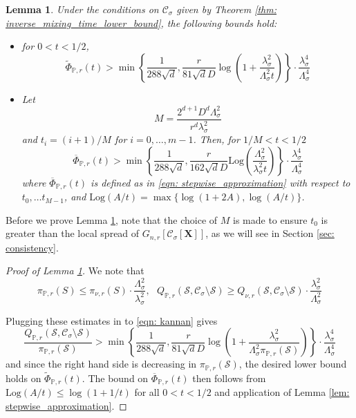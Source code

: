 \documentclass{article}
\newcommand{\1}{\mathbf{1}}
\newcommand{\Log}{\mathrm{Log}}
\newcommand{\Xbf}{\mathbf{X}}
\newcommand{\Pbb}{\mathbb{P}}
\newcommand{\Sset}{\mathcal{S}}
\newcommand{\Cset}{\mathcal{C}}
\newcommand{\Csig}{\Cset_{\sigma}}
\theoremstyle{aldenthm}
\newtheorem{lemma}{Lemma}
\begin{document}
\begin{lemma}
	\label{lem: continuous_conductance_lower_bound}
	Under the conditions on $\Csig$ given by Theorem \ref{thm: inverse_mixing_time_lower_bound}, the following bounds hold: 
	\begin{itemize}
		\item 
		for $0 < t < 1/2$,
		\begin{equation*}
		\widetilde{\Phi}_{\Pbb,r}(t) > \min\left\{\frac{1}{288\sqrt{d}},\frac{r}{81 \sqrt{d}D}\log\left(1 + \frac{\lambda_{\sigma}^2}{\Lambda_{\sigma}^2 t}\right)\right\} \cdot \frac{\lambda_{\sigma}^4}{\Lambda_{\sigma}^4}
		\end{equation*}
		\item
		Let
		\begin{equation*}
		M = \frac{2^{d+1}D^d \Lambda_{\sigma}^2}{r^d \lambda_{\sigma}^2}
		\end{equation*}
		and $t_i = (i + 1)/M$ for $i = 0, \ldots, m - 1$. Then, for $1/M < t < 1/2$
		\begin{equation*}
		\overline{\Phi}_{\Pbb,r}(t) > \min\left\{\frac{1}{288\sqrt{d}},\frac{r}{162 \sqrt{d}D}\Log\left( \frac{\Lambda_{\sigma}^2}{\lambda_{\sigma}^2 t}\right)\right\} \cdot \frac{\lambda_{\sigma}^4}{\Lambda_{\sigma}^4}
		\end{equation*}
		where $\overline{\Phi}_{\Pbb,r}(t)$ is defined as in \eqref{eqn: stepwise_approximation} with respect to $t_0, \ldots t_{M - 1}$, and $\Log(A/t) = \max\{\log(1 + 2A), \log(A/t)\}$.
	\end{itemize}
\end{lemma}
Before we prove Lemma \ref{lem: continuous_conductance_lower_bound}, note that the choice of $M$ is made to ensure $t_0$ is greater than the local spread of $G_{n,r}\left[\Csig[\Xbf]\right]$, as we will see in Section \ref{sec: consistency}.
\begin{proof}[Proof of Lemma \ref{lem: continuous_conductance_lower_bound}]
	We note that
	\begin{equation*}
	\pi_{\Pbb,r}(S) \leq \pi_{\nu,r}(S) \cdot \frac{\Lambda_{\sigma}^2}{\lambda_{\sigma}^2}, ~~~ Q_{\Pbb,r}(\Sset, \Csig \setminus \Sset) \geq Q_{\nu,r}(\Sset, \Csig \setminus \Sset) \cdot \frac{\lambda_{\sigma}^2}{\Lambda_{\sigma}^2}
	\end{equation*}
	
	Plugging these estimates in to \eqref{eqn: kannan} gives
	\begin{equation*}
	\frac{Q_{\Pbb,r}(\Sset, \Csig \setminus \Sset)}{\pi_{\Pbb,r}(\Sset)} > \min\left\{\frac{1}{288\sqrt{d}},\frac{r}{81 \sqrt{d}D}\log\left(1 + \frac{\lambda_{\sigma}^2}{\Lambda_{\sigma}^2 \pi_{\Pbb,r}(\Sset)}\right)\right\} \cdot \frac{\lambda_{\sigma}^4}{\Lambda_{\sigma}^4}
	\end{equation*}
	and since the right hand side is decreasing in $\pi_{\Pbb,r}(\Sset)$, the desired lower bound holds on $\widetilde{\Phi}_{\Pbb,r}(t)$.  The bound on $\overline{\Phi}_{\Pbb,r}(t)$ then follows from  $\Log(A/t) \leq \log(1 + 1/t)$ for all $0 < t < 1/2$ and application of Lemma \ref{lem: stepwise_approximation}.
\end{proof}
\end{document}
